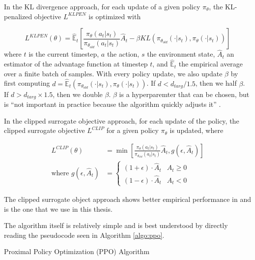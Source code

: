 In the KL divergence approach, for each update of a given policy $\pi_\theta$, the KL-penalized objective $L^{KLPEN}$ is optimized with

\begin{equation}
	L^{KLPEN}(\theta) = \hat{\mathbb{E}}_t \left[\frac{\pi_\theta(a_t | s_t)}{\pi_{\theta_{old}} (a_t | s_t)} \hat{A}_t - \beta KL \left( \pi_{\theta_{old}} (\cdot | s_t), \pi_\theta(\cdot | s_t)\right) \right]
\end{equation}
where $t$ is the current timestep, $a$ the action, $s$ the environment state, $\hat{A}_t$ an estimator of the advantage function at timestep $t$, and $\hat{\mathbb{E}}_t$ the empirical average over a finite batch of samples.
With every policy update, we also update $\beta$ by first computing $d = \hat{\mathbb{E}}_t\left(\pi_{\theta_{old}} (\cdot | s_t), \pi_{\theta}(\cdot | s_t)\right)$.
If $d < d_{targ} / 1.5$, then we half $\beta$.
If $d > d_{targ} \times 1.5$, then we double $\beta$. $\beta$ is a hyperparemter that can be chosen, but is ``not important in practice because the algorithm quickly adjusts it'' \cite{schulman2017proximal}.

In the clipped surrogate objective approach, for each update of the policy, the clipped surrogate objective $L^{CLIP}$ for a given policy $\pi_\theta$ is updated, where

\begin{align}
	L^{CLIP}(\theta) &= \min \left[ 
		\frac{\pi_\theta(a_t | s_t)}{\pi_{\theta_{old}} (a_t | s_t)} \hat{A}_t, g(\epsilon, \hat{A}_t)
	\right]\\
	\text{where } g(\epsilon, \hat{A}_t) &= \begin{cases}
		(1 + \epsilon) \cdot \hat{A}_t & \hat{A}_t \geq 0 \\
		(1 - \epsilon) \cdot \hat{A}_t & \hat{A}_t < 0
	\end{cases}
\end{align}

The clipped surrogate object approach shows better empirical performance in \cite{schulman2017proximal} and is the one that we use in this thesis.

The algorithm itself is relatively simple and is best understood by directly reading the pseudocode seen in Algorithm \ref{algo:ppo}.

\begin{algorithm}
	\SetAlgoLined
	\caption{Proximal Policy Optimization (PPO) Algorithm}\label{algo:ppo}
\end{algorithm}

